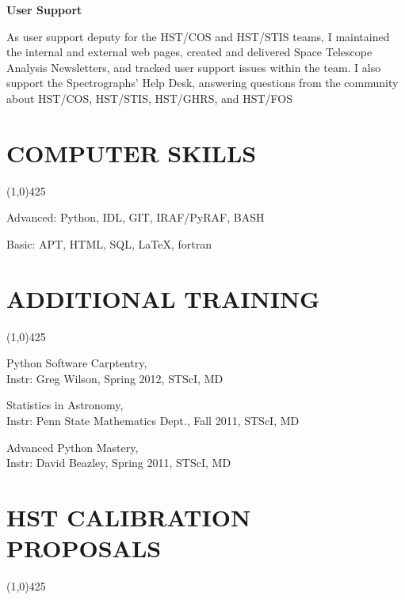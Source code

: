 \documentclass{res}
\begin{document}
\begin{resume}
   {\bf  User Support}
   		\begin{itemize}
		As user support deputy for the HST/COS and HST/STIS teams, I maintained the internal and external web pages, created and delivered Space Telescope Analysis Newsletters, and tracked user support issues within the team. I also support the Spectrographs' Help Desk, answering questions from the community about HST/COS, HST/STIS, HST/GHRS, and HST/FOS
		\end{itemize}
	
	


\section{COMPUTER SKILLS}
\vspace{-.2in}
\begin{center}
\line(1,0){425}
\end{center}
\vspace{-.3in}
\vspace{0.1in}
Advanced: Python, IDL, GIT, IRAF/PyRAF, BASH

Basic: APT, HTML, SQL, LaTeX, fortran
 

\section{ADDITIONAL TRAINING}
\vspace{-.2in} 
\begin{center}
\line(1,0){425}
\end{center}
\vspace{-.24in} 
\vspace{0.1in}

Python Software Carptentry, \\
Instr: Greg Wilson, Spring 2012, STScI, MD

Statistics in Astronomy, \\
Instr: Penn State Mathematics Dept., Fall 2011, STScI, MD

Advanced Python Mastery, \\
Instr: David Beazley, Spring 2011, STScI, MD

\section{HST CALIBRATION PROPOSALS}
\vspace{-.2in} 
\begin{center}
\line(1,0){425}
\end{center}
\vspace{-.25in} 
\vspace{0.1in}


\end{resume}
\end{document}
